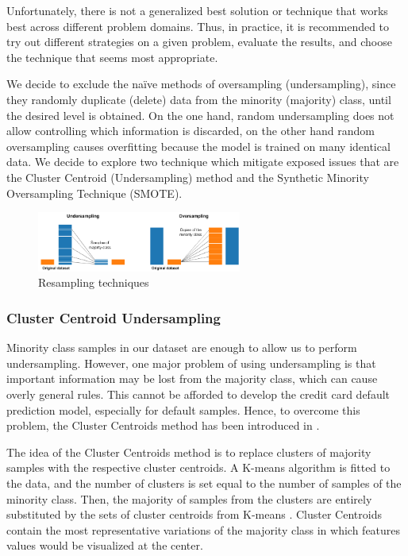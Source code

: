 \documentclass{article}
\begin{document}
Unfortunately, there is not a generalized best solution or technique that works best across different problem domains. Thus, in practice, it is recommended to try out different strategies on a given problem, evaluate the results, and choose the technique that seems most appropriate.

We decide to exclude the naïve methods of oversampling (undersampling), since they randomly duplicate (delete) data from the minority (majority) class, until the desired level is obtained. On the one hand, random undersampling does not allow controlling which information is discarded, on the other hand random oversampling causes overfitting because the model is trained on many identical data. We decide to explore two technique which mitigate exposed issues that are the Cluster Centroid (Undersampling) method and the Synthetic Minority Oversampling Technique (SMOTE).

\begin{figure}[H]
\centering
\includegraphics[width=0.6\textwidth]{resampling.png}
\caption{Resampling techniques}
\end{figure}

\subsubsection{Cluster Centroid Undersampling}

Minority class samples in our dataset are enough to allow us to perform undersampling. However, one major problem of using undersampling is that important information may be lost from the majority class, which can cause overly general rules. This cannot be afforded to develop the credit card default prediction model, especially for default samples. Hence, to overcome this problem, the Cluster Centroids method has been introduced in \cite{sei}.

The idea of the Cluster Centroids method is to replace clusters of majority samples with the respective cluster centroids. A K-means algorithm is fitted to the data, and the number of clusters is set equal to the number of samples of the minority class. Then, the majority of samples from the clusters are entirely substituted by the sets of cluster centroids from K-means \cite{sette}. Cluster Centroids contain the most representative variations of the majority class in which features values would be visualized at the center.
\end{document}

